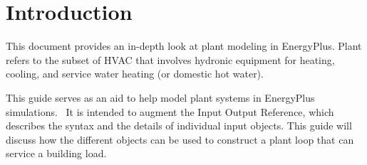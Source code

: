 \chapter{Introduction}\label{introduction}

This document provides an in-depth look at plant modeling in EnergyPlus. Plant refers to the subset of HVAC that involves hydronic equipment for heating, cooling, and service water heating (or domestic hot water).

This guide serves as an aid to help model plant systems in EnergyPlus simulations.~ It is intended to augment the Input Output Reference, which describes the syntax and the details of individual input objects. This guide will discuss how the different objects can be used to construct a plant loop that can service a building load.
